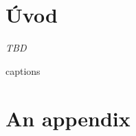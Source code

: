\documentclass[
  digital, %
  table,   %
  lof,     %
  lot,     %
]{fithesis3}
\newcommand{\zv}{\textit}
\begin{document}
\chapter{Úvod}
\zv{TBD}


%

%

%

%

%
	
%
  


{\csname captions\languagename\endcsname %
\makeatletter %
  \thesis@selectLocale{\thesis@locale}\makeatother
\printbibliography[heading=bibintoc]} %


{} %
\printindex

\appendix %
\chapter{An appendix}




\end{document}
